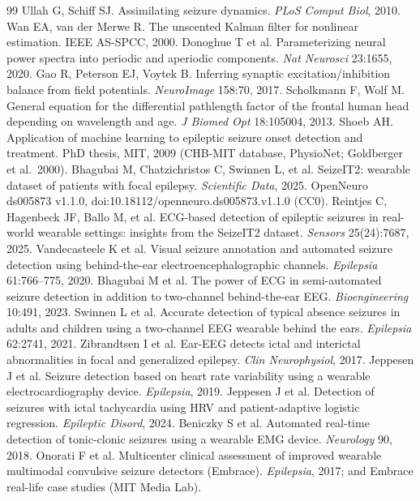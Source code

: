 \begin{thebibliography}{99}
 Ullah G, Schiff SJ. Assimilating seizure dynamics. \emph{PLoS Comput Biol}, 2010.
 Wan EA, van der Merwe R. The unscented Kalman filter for nonlinear estimation. IEEE AS-SPCC, 2000.
 Donoghue T et al. Parameterizing neural power spectra into periodic and aperiodic components. \emph{Nat Neurosci} 23:1655, 2020.
 Gao R, Peterson EJ, Voytek B. Inferring synaptic excitation/inhibition balance from field potentials. \emph{NeuroImage} 158:70, 2017.
 Scholkmann F, Wolf M. General equation for the differential pathlength factor of the frontal human head depending on wavelength and age. \emph{J Biomed Opt} 18:105004, 2013.
 Shoeb AH. Application of machine learning to epileptic seizure onset detection and treatment. PhD thesis, MIT, 2009 (CHB-MIT database, PhysioNet; Goldberger et al.\ 2000).
 Bhagubai M, Chatzichristos C, Swinnen L, et al. SeizeIT2: wearable dataset of patients with focal epilepsy. \emph{Scientific Data}, 2025. OpenNeuro ds005873 v1.1.0, doi:10.18112/openneuro.ds005873.v1.1.0 (CC0).
 Reintjes C, Hagenbeck JF, Ballo M, et al. ECG-based detection of epileptic seizures in real-world wearable settings: insights from the SeizeIT2 dataset. \emph{Sensors} 25(24):7687, 2025.
 Vandecasteele K et al. Visual seizure annotation and automated seizure detection using behind-the-ear electroencephalographic channels. \emph{Epilepsia} 61:766--775, 2020.
 Bhagubai M et al. The power of ECG in semi-automated seizure detection in addition to two-channel behind-the-ear EEG. \emph{Bioengineering} 10:491, 2023.
 Swinnen L et al. Accurate detection of typical absence seizures in adults and children using a two-channel EEG wearable behind the ears. \emph{Epilepsia} 62:2741, 2021.
 Zibrandtsen I et al. Ear-EEG detects ictal and interictal abnormalities in focal and generalized epilepsy. \emph{Clin Neurophysiol}, 2017.
 Jeppesen J et al. Seizure detection based on heart rate variability using a wearable electrocardiography device. \emph{Epilepsia}, 2019.
 Jeppesen J et al. Detection of seizures with ictal tachycardia using HRV and patient-adaptive logistic regression. \emph{Epileptic Disord}, 2024.
 Beniczky S et al. Automated real-time detection of tonic-clonic seizures using a wearable EMG device. \emph{Neurology} 90, 2018.
 Onorati F et al. Multicenter clinical assessment of improved wearable multimodal convulsive seizure detectors (Embrace). \emph{Epilepsia}, 2017; and Embrace real-life case studies (MIT Media Lab).

\end{thebibliography}
